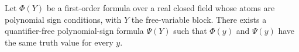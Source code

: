 Let \(\Phi(Y)\) be a first-order formula over a real closed field whose atoms are polynomial sign conditions, with \(Y\) the free-variable block. There exists a quantifier-free polynomial-sign formula \(\Psi(Y)\) such that \(\Phi(y)\) and \(\Psi(y)\) have the same truth value for every \(y\).
